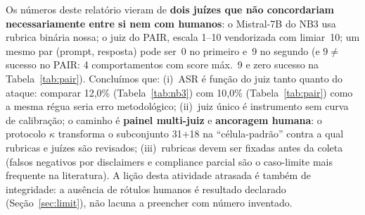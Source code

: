 \documentclass[12pt]{article}
\begin{document}
Os números deste relatório vieram de \textbf{dois juízes que não concordariam necessariamente entre si nem com humanos}: o Mistral-7B do NB3 usa rubrica binária nossa; o juiz do PAIR, escala 1--10 vendorizada com limiar~10; um mesmo par (prompt, resposta) pode ser~0 no primeiro e~9 no segundo (e $9 \neq$ sucesso no PAIR: 4 comportamentos com score máx.~9 e zero sucesso na Tabela~\ref{tab:pair}). Concluímos que: (i)~ASR é função do juiz tanto quanto do ataque: comparar 12,0\% (Tabela~\ref{tab:nb3}) com 10,0\% (Tabela~\ref{tab:pair}) como a mesma régua seria erro metodológico; (ii)~juiz único é instrumento sem curva de calibração; o caminho é \textbf{painel multi-juiz} e \textbf{ancoragem humana}: o protocolo $\kappa$ transforma o subconjunto 31$+$18 na ``célula-padrão'' contra a qual rubricas e juízes são revisados; (iii)~rubricas devem ser fixadas antes da coleta (falsos negativos por disclaimers e compliance parcial são o caso-limite mais frequente na literatura). A lição desta atividade atrasada é também de integridade: a ausência de rótulos humanos é resultado declarado (Seção~\ref{sec:limit}), não lacuna a preencher com número inventado.

{\footnotesize


}
\end{document}
